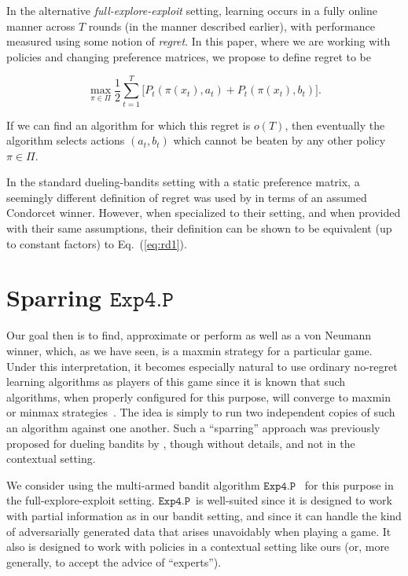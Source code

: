 In the alternative {\em full-explore-exploit\/} setting, learning occurs in a fully online manner across $T$ rounds (in the manner described earlier), with performance measured using some notion of {\em regret}. In this paper, where we are working with policies and changing preference matrices, we propose to define regret to be

\begin{equation} \label{eq:rd1}
  \max_{\pi\in\Pi}  \frac{1}{2}
       \sum_{t=1}^T \bigl[ {P_t({\pi(x_t)},{a_t})} + {P_t({\pi(x_t)},{b_t})} \bigr].
\end{equation}

If we can find an algorithm for which this regret is $o(T)$, then eventually the algorithm selects actions $(a_t,b_t)$ which cannot be beaten by any other policy $\pi\in\Pi$.

In the standard dueling-bandits setting with a static preference matrix, a seemingly different definition of regret was used by \citet{yue09:k-arm} in terms of an assumed Condorcet winner. However, when specialized to their setting, and when provided with their same assumptions, their definition can be shown to be equivalent (up to constant factors) to Eq.~(\ref{eq:rd1}).

\section{Sparring \ensuremath{\mathtt{Exp4.P}}}
\label{sec:exp4-spar}

Our goal then is to find, approximate or perform as well as a von Neumann winner, which, as we have seen, is a maxmin strategy for a particular game. Under this interpretation, it becomes especially natural to use ordinary no-regret learning algorithms as players of this game since it is known that such algorithms, when properly configured for this purpose, will converge to maxmin or minmax strategies~\citep{FreundSc-GEB}. The idea is simply to run two independent copies of such an algorithm against one another. Such a ``sparring'' approach was previously proposed for dueling bandits by \cite{Ailon:2014}, though without details, and not in the contextual setting.

We consider using the multi-armed bandit algorithm \ensuremath{\mathtt{Exp4.P}}~\citep{beygelzimer11:epoch}
for this purpose in the full-explore-exploit setting.
\ensuremath{\mathtt{Exp4.P}}\ is well-suited since it is designed to work with partial information as in our bandit setting, and since it can handle the kind of adversarially generated data that arises unavoidably when playing a game. It also is designed to work with policies in a contextual setting like ours (or, more generally, to accept the advice of ``experts'').

